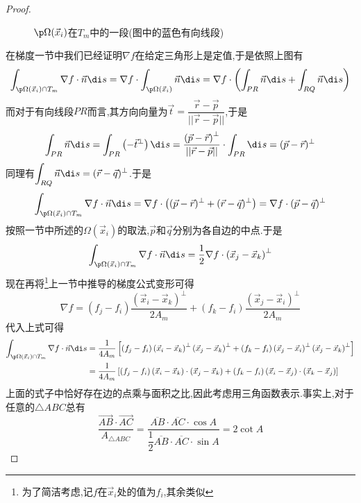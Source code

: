 \documentclass{ctexart}
\begin{document}
\begin{proof}
\begin{figure}[H]
        \caption{$\p\Omega(\vec{x}_i)$在$T_m$中的一段(图中的蓝色有向线段)}
    \end{figure}
    \indent 在梯度一节中我们已经证明$\nabla f$在给定三角形上是定值,于是依照上图有
    \[\int_{\p\Omega(\vec{x}_i)\cap T_m}\nabla f\cdot\vec{n}\di s=\nabla f\cdot\int_{\p\Omega(\vec{x}_i)}\vec{n}\di s=\nabla f\cdot\left(\int_{PR}\vec{n}\di s+\int_{RQ}\vec{n}\di s\right)\]
    而对于有向线段$PR$而言,其方向向量为$\vec{t}=\dfrac{\vec{r}-\vec{p}}{||\vec{r}-\vec{p}||}$,于是
    \[\int_{PR}\vec{n}\di s=\int_{PR}\left(-\vec{t}^\bot\right)\di s=\dfrac{\left(\vec{p}-\vec{r}\right)^\bot}{||\vec{r}-\vec{p}||}\cdot\int_{PR}\di s=(\vec{p}-\vec{r})^\bot\]
    同理有$\displaystyle\int_{RQ}\vec{n}\di s=(\vec{r}-\vec{q})^\bot$.于是
    \[\int_{\p\Omega(\vec{x}_i)\cap T_m}\nabla f\cdot\vec{n}\di s=\nabla f\cdot\left((\vec{p}-\vec{r})^\bot+(\vec{r}-\vec{q})^\bot\right)=\nabla f\cdot(\vec{p}-\vec{q})^\bot\]
    按照一节中所述的$\Omega\left(\vec{x}_i\right)$的取法,$\vec{p}$和$\vec{q}$分别为各自边的中点.于是
    \[\int_{\p\Omega(\vec{x}_i)\cap T_m}\nabla f\cdot\vec{n}\di s=\dfrac12\nabla f\cdot\left(\vec{x}_j-\vec{x}_k\right)^\bot\]
    现在再将\footnote{为了简洁考虑,记$f$在$\vec{x}_i$处的值为$f_i$,其余类似}上一节中推导的梯度公式变形可得
    \[\nabla f=\left(f_j-f_i\right)\dfrac{\left(\vec{x}_i-\vec{x}_k\right)^\bot}{2A_m}+\left(f_k-f_i\right)\dfrac{\left(\vec{x}_j-\vec{x}_i\right)^\bot}{2A_m}\]
    代入上式可得
    \[\begin{aligned}
        \int_{\p\Omega(\vec{x}_i)\cap T_m}\nabla f\cdot\vec{n}\di s
        &=\dfrac{1}{4A_m}\left[\left(f_j-f_i\right)\left(\vec{x}_i-\vec{x}_k\right)^\bot\left(\vec{x}_j-\vec{x}_k\right)^\bot+\left(f_k-f_i\right)\left(\vec{x}_j-\vec{x}_i\right)^\bot\left(\vec{x}_j-\vec{x}_k\right)^\bot\right] \\
        &= \dfrac{1}{4A_m}\left[\left(f_j-f_i\right)\left(\vec{x}_i-\vec{x}_k\right)\cdot\left(\vec{x}_j-\vec{x}_k\right)+\left(f_k-f_i\right)\left(\vec{x}_i-\vec{x}_j\right)\cdot\left(\vec{x}_k-\vec{x}_j\right)\right]
    \end{aligned}\]
    上面的式子中恰好存在边的点乘与面积之比,因此考虑用三角函数表示.事实上,对于任意的$\triangle ABC$总有
    \[\dfrac{\overrightarrow{AB}\cdot\overrightarrow{AC}}{A_{\triangle ABC}}=\dfrac{\overline{AB}\cdot\overline{AC}\cdot\cos A}{\dfrac12\overline{AB}\cdot\overline{AC}\cdot\sin A}=2\cot A\]

\end{proof}
\end{document}
